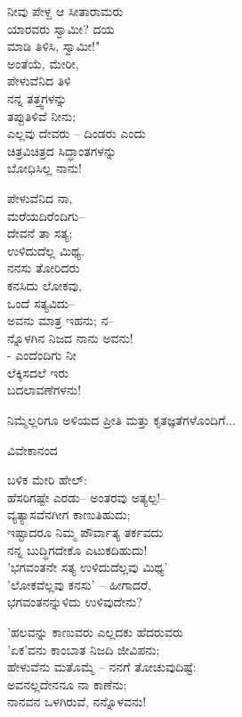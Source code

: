 \begin{myquote}
ನೀವು ಪೇಳ್ದ ಆ ಸೀತಾರಾಮರು\\ಯಾರವರು ಸ್ವಾಮೀ? ದಯ\\ಮಾಡಿ ತಿಳಿಸಿ, ಸ್ವಾಮೀ!"\\ಅಂತೆಯೆ, ಮೇರೀ,\\ಪೇಳುವೆನಿದ ತಿಳಿ\\ನನ್ನ ತತ್ತ್ವಗಳನ್ನು\\ತಪ್ಪುತಿಳಿವೆ ನೀನು;\\ಎಲ್ಲವು ದೇವರು – ದಿಂಡರು ಎಂದು\\ಚಿತ್ರವಿಚಿತ್ರದ ಸಿದ್ಧಾಂತಗಳನ್ನು\\ಬೋಧಿಸಿಲ್ಲ ನಾನು!
\end{myquote}

\begin{myquote}
ಪೇಳುವೆನಿದ ನಾ,\\ಮರೆಯದಿರೆಂದಿಗು–\\ದೇವನೆ ತಾ ಸತ್ಯ;\\ಉಳಿದುದೆಲ್ಲ ಮಿಥ್ಯ.\\ನನಸು ತೋರಿದರು\\ಕನಸಿದು ಲೋಕವು,\\ಒಂದೆ ಸತ್ಯವಿದು–\\ಅವನು ಮಾತ್ರ ಇಹನು; ನ–\\ನ್ನೊಳಗಿನ ನಿಜದ ನಾನು ಅವನು!\\- ಎಂದೆಂದಿಗು ನೀ\\ಲೆಕ್ಕಿಸದಲೆ ಇರು\\ಬದಲಾವಣೆಗಳನು!
\end{myquote}

ನಿಮ್ಮೆಲ್ಲರಿಗೂ ಅಳಿಯದ ಪ್ರೀತಿ ಮತ್ತು ಕೃತಜ್ಞತೆಗಳೊಂದಿಗೆ...

\begin{flushright}
ವಿವೇಕಾನಂದ
\end{flushright}

\begin{myquote}
ಬಳಿಕ ಮೇರಿ ಹೇಲ್:\\ಹೆಸರಿಗಷ್ಟೇ ಎರಡು– ಅಂತರವು ಅತ್ಯಲ್ಪ!–\\ವ್ಯತ್ಯಾಸವೆನಗೀಗ ಕಾಣುತಿಹುದು;\\ಇಷ್ಟಾದರೂ ನಿಮ್ಮ ಪೌರ್ವಾತ್ಯ ತರ್ಕವದು\\ನನ್ನ ಬುದ್ಧಿಗದೇಕೊ ಎಟುಕದಿಹುದು!\\'ಭಗವಂತನೇ ಸತ್ಯ ಉಳಿದುದೆಲ್ಲವು ಮಿಥ್ಯ'\\'ಲೋಕವೆಲ್ಲವು ಕನಸು' – ಹೀಗಾದರೆ,\\ಭಗವಂತನನ್ನುಳಿದು ಉಳಿವುದೇನು?
\end{myquote}

\begin{myquote}
'ಹಲವನ್ನು ಕಾಣುವರು ಎಲ್ಲದಕು ಹೆದರುವರು\\'ಏಕ'ವನು ಕಾಂಬಾತ ನಿಜದಿ ಜೀವಿಪನು;\\ಹೇಳುವೆನು ಮತೊಮ್ಮೆ – ನನಗೆ ತೋಚುವುದಿಷ್ಟೆ:\\ಅವನಲ್ಲದೇನನೂ ನಾ ಕಾಣೆನು;\\ನಾನವನ ಒಳಗಿರುವೆ, ನನ್ನೊಳವನು!
\end{myquote}


